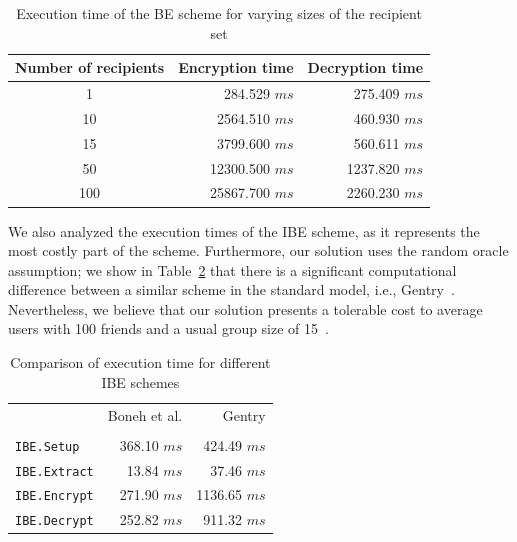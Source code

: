 \documentclass{llncs}
\newcommand{\tabref}[1]{{Table}~\ref{#1}}
\newcommand{\ms}{\ensuremath{ms}}
\begin{document}
\begin{table}
\begin{center}
\begin{tabular}{ | c | r | r |}
    \hline
    Number of recipients & Encryption time & Decryption time \\ \hline  \hline
    1 & 284.529 \ms & 275.409 \ms \\
    10 & 2564.510 \ms & 460.930 \ms \\
    15 & 3799.600 \ms & 560.611 \ms \\
    50 & 12300.500 \ms & 1237.820 \ms \\
    100 & 25867.700 \ms & 2260.230 \ms \\ \hline
\end{tabular}
\end{center}
\caption{Execution time of the BE scheme for varying sizes of the recipient set}
\label{table:BE_exec_times}
\end{table}

We also analyzed the execution times of the IBE scheme, as it represents the most costly part of the scheme. Furthermore, our solution uses the random oracle assumption; we show in \tabref{table:exec_times} that there is a significant computational difference between a similar scheme in the standard model, i.e., Gentry~\cite{GentryRandomOracles}.
Nevertheless, we believe that our solution presents a tolerable cost to average users with 100 friends and a usual group size of 15~\cite{DBLP:journals/corr/abs-1111-4503}. 

\begin{table}
\begin{center}
\begin{tabular}{ | l | r | r |}
    \cline{2-3}
   \multicolumn{1}{c|}{}& Boneh et al. & Gentry \\ 
   \cline{2-3} 
        \multicolumn{3}{c}{\vspace{-3mm}} \\ \hline 
  \texttt{IBE.Setup} & 368.10 \ms &  424.49 \ms \\
  \texttt{IBE.Extract} & 13.84 \ms & 37.46 \ms \\
  \texttt{IBE.Encrypt} & 271.90 \ms & 1136.65 \ms \\
  \texttt{IBE.Decrypt} & 252.82 \ms & 911.32 \ms\\ \hline 
\end{tabular}
\end{center}
\caption{Comparison of execution time for different IBE schemes}
\label{table:exec_times}
\end{table}
\end{document}
